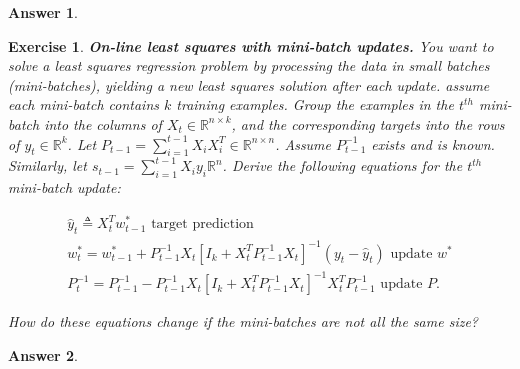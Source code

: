 \documentclass[12pt]{article}
\theoremstyle{colon}
\newtheorem{exercise}{Exercise}
\newtheorem*{answer}{Answer}
\begin{document}
\begin{answer}
  
\end{answer}

\clearpage

\begin{exercise}
  \textbf{On-line least squares with mini-batch updates.} You want to solve a least squares regression problem by processing the data in small batches (mini-batches), yielding a new least squares solution after each update. assume each mini-batch contains $k$ training examples. Group the examples in the $t^{th}$ mini-batch into the columns of $X_t \in \mathbb{R}^{n \times k}$, and the corresponding targets into the rows of $y_t \in \mathbb{R}^k$. Let $P_{t-1} = \sum_{i=1}^{t-1} X_i X_i^T \in \mathbb{R}^{n \times n}$. Assume $P_{t-1}^{-1}$ exists and is known. Similarly, let $s_{t-1} = \sum_{i=1}^{t-1} X_i y_i \mathbb{R}^n$. Derive the following equations for the $t^{th}$ mini-batch update:

  \begin{gather*}
    \hat{y}_t \triangleq X_t^T w_{t-1}^* \text{ target prediction} \\
    w_t^* = w_{t-1}^* + P_{t-1}^{-1} X_t [I_k + X_t^T P_{t-1}^{-1} X_t]^{-1} (y_t - \hat{y}_t) \text{ update } w^* \\
    P_t^{-1} = P_{t-1}^{-1} - P_{t-1}^{-1} X_t [I_k + X_t^T P_{t-1}^{-1} X_t]^{-1} X_t^T P_{t-1}^{-1} \text{ update } P.
  \end{gather*}

  How do these equations change if the mini-batches are not all the same size?
\end{exercise}

\begin{answer}
  
\end{answer}

\clearpage
\end{document}
